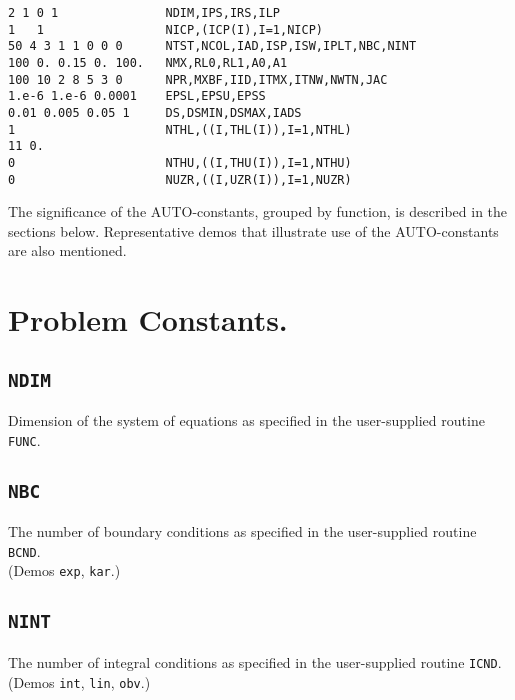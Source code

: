 \documentclass[12pt]{report}
\begin{document}
\begin{verbatim}
2 1 0 1               NDIM,IPS,IRS,ILP
1   1                 NICP,(ICP(I),I=1,NICP)
50 4 3 1 1 0 0 0      NTST,NCOL,IAD,ISP,ISW,IPLT,NBC,NINT
100 0. 0.15 0. 100.   NMX,RL0,RL1,A0,A1
100 10 2 8 5 3 0      NPR,MXBF,IID,ITMX,ITNW,NWTN,JAC
1.e-6 1.e-6 0.0001    EPSL,EPSU,EPSS
0.01 0.005 0.05 1     DS,DSMIN,DSMAX,IADS
1                     NTHL,((I,THL(I)),I=1,NTHL)
11 0.
0                     NTHU,((I,THU(I)),I=1,NTHU)
0                     NUZR,((I,UZR(I)),I=1,NUZR)
\end{verbatim}

The significance of the {\cal AUTO}-constants, grouped by function, is 
described in the sections below. 
Representative demos that illustrate use of the {\cal AUTO}-constants
are also mentioned.

\section{ Problem Constants.} \label{sec:Problem_constants}
\subsection{\tt NDIM} \label{sec:NDIM}
 Dimension of the system of equations as specified in the user-supplied
 routine {\tt FUNC}.

\subsection{\tt NBC}  \label{sec:NBC}
 The number of boundary conditions as specified in the user-supplied
 routine {\tt BCND}. \\
(Demos {\tt exp}, {\tt kar}.)

\subsection{\tt NINT}  \label{sec:NINT}
 The number of integral conditions as specified in the user-supplied
 routine {\tt ICND}. \\ 
(Demos {\tt int}, {\tt lin}, {\tt obv}.)
\end{document}
